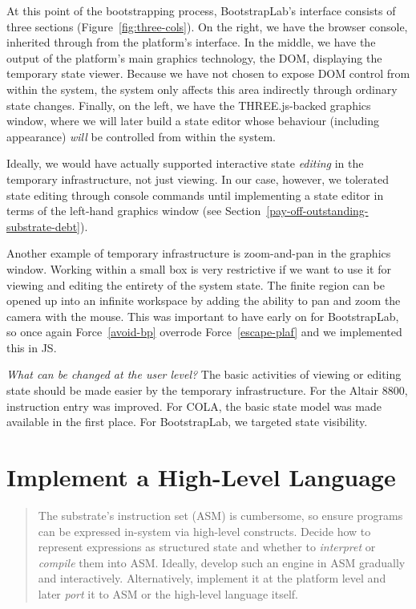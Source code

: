 \documentclass[ twoside,openright,titlepage,numbers=noenddot,headinclude,footinclude,cleardoublepage=empty,abstract=on,
                BCOR=5mm,paper=a4,fontsize=11pt
                ]{scrreprt}
\theoremstyle{definition}
\begin{document}
At this point of the bootstrapping process, BootstrapLab's interface
consists of three sections (Figure~\ref{fig:three-cols}). On the right,
we have the browser console, inherited through from the platform's
interface. In the middle, we have the output of the platform's main
graphics technology, the \ac{DOM}, displaying the temporary state
viewer. Because we have not chosen to expose \ac{DOM} control from
within the system, the system only affects this area indirectly through
ordinary state changes. Finally, on the left, we have the
THREE.js-backed graphics window, where we will later build a state
editor whose behaviour (including appearance) \emph{will} be controlled
from within the system.

Ideally, we would have actually supported interactive state
\emph{editing} in the temporary infrastructure, not just viewing. In our
case, however, we tolerated state editing through console commands until
implementing a state editor in terms of the left-hand graphics window
(see Section~\ref{pay-off-outstanding-substrate-debt}).

Another example of temporary infrastructure is zoom-and-pan in the
graphics window. Working within a small box is very restrictive if we
want to use it for viewing and editing the entirety of the system state.
The finite region can be opened up into an infinite workspace by adding
the ability to pan and zoom the camera with the mouse. This was
important to have early on for BootstrapLab, so once again
Force~\ref{avoid-bp} overrode Force~\ref{escape-plaf} and we implemented
this in \ac{JS}.

\emph{What can be changed at the user level?} The basic activities of
viewing or editing state should be made easier by the temporary
infrastructure. For the Altair 8800, instruction entry was improved. For
\ac{COLA}, the basic state model was made available in the first place.
For BootstrapLab, we targeted state visibility.

\hypertarget{implement-a-high-level-language}{\section{Implement a High-Level
Language}\label{implement-a-high-level-language}}

\begin{quote}
The substrate's instruction set (ASM) is cumbersome, so ensure programs
can be expressed in-system via high-level constructs. Decide how to
represent expressions as structured state and whether to
\emph{interpret} or \emph{compile} them into ASM. Ideally, develop such
an engine in ASM gradually and interactively. Alternatively, implement
it at the platform level and later \emph{port} it to ASM or the
high-level language itself.
\end{quote}
\end{document}
